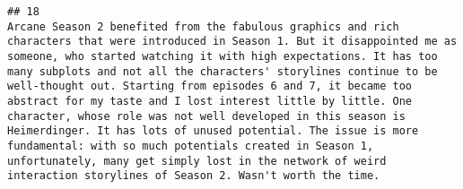 \documentclass[
]{article}
\begin{document}
\begin{verbatim}
## 18                                                                                                                                                                                                                                                                                                                                                                                                                                                                                                                                                                                                                                                                                                                                                                                                                                                                                                                                                                                                                                                                                                                                                                                                                                                                                                                                                                                                                                                                                                                                                                                                                                                                                                                                                                                                                                                                                                                                                                                                                                                                                                                                                                                                                                                                                                                                    Arcane Season 2 benefited from the fabulous graphics and rich characters that were introduced in Season 1. But it disappointed me as someone, who started watching it with high expectations. It has too many subplots and not all the characters' storylines continue to be well-thought out. Starting from episodes 6 and 7, it became too abstract for my taste and I lost interest little by little. One character, whose role was not well developed in this season is Heimerdinger. It has lots of unused potential. The issue is more fundamental: with so much potentials created in Season 1, unfortunately, many get simply lost in the network of weird interaction storylines of Season 2. Wasn't worth the time.

\end{verbatim}
\end{document}
